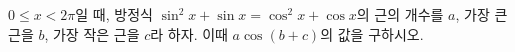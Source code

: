 $0\le x<2\pi$일 때, 방정식 $\sin^2 x+\sin x=\cos^2 x+\cos x$의 근의 개수를 $a$, 가장 큰 근을 $b$, 가장 작은 근을 $c$라 하자. 이때 $a\cos(b+c)$의 값을 구하시오.

